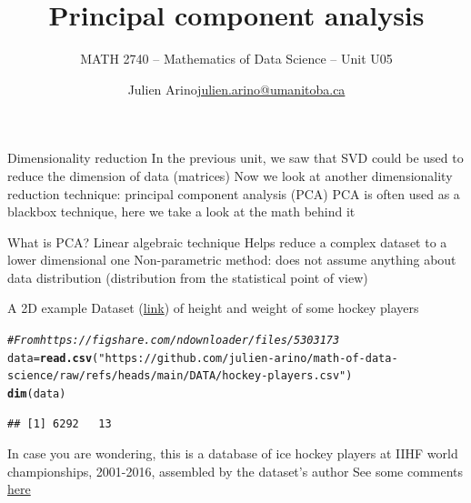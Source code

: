 \documentclass[aspectratio=169]{beamer}\usepackage[]{graphicx}\usepackage[]{xcolor}
\subtitle{MATH 2740 -- Mathematics of Data Science -- Unit U05}
\author{\texorpdfstring{Julien Arino\newline\url{julien.arino@umanitoba.ca}}{Julien Arino}}
\institute{Department of Mathematics @ University of Manitoba}
\title{Principal component analysis}
\makeatletter
\newcommand{\hlsng}[1]{\textcolor[rgb]{0.192,0.494,0.8}{#1}}%
\newcommand{\hlcom}[1]{\textcolor[rgb]{0.678,0.584,0.686}{\textit{#1}}}%
\newcommand{\hldef}[1]{\textcolor[rgb]{0.345,0.345,0.345}{#1}}%
\newcommand{\hlkwb}[1]{\textcolor[rgb]{0.69,0.353,0.396}{#1}}%
\newcommand{\hlkwd}[1]{\textcolor[rgb]{0.737,0.353,0.396}{\textbf{#1}}}%
\newenvironment{kframe}{%
 \def\at@end@of@kframe{}%
 \ifinner\ifhmode%
  \def\at@end@of@kframe{\end{minipage}}%
  \begin{minipage}{\columnwidth}%
 \fi\fi%
 \def\FrameCommand##1{\hskip\@totalleftmargin \hskip-\fboxsep
 \colorbox{shadecolor}{##1}\hskip-\fboxsep
     \hskip-\linewidth \hskip-\@totalleftmargin \hskip\columnwidth}%
 \MakeFramed {\advance\hsize-\width
   \@totalleftmargin\z@ \linewidth\hsize
   \@setminipage}}%
 {\par\unskip\endMakeFramed%
 \at@end@of@kframe}
\newenvironment{knitrout}{}{} %
\makeatother
\begin{document}
\setcounter{theorem}{79}

\SStitlepage
\SSoutlinepage



\begin{frame}{Dimensionality reduction}
In the previous unit, we saw that SVD could be used to reduce the dimension of data (matrices)
\vfill
Now we look at another dimensionality reduction technique: principal component analysis (PCA)
\vfill
PCA is often used as a blackbox technique, here we take a look at the math behind it
\end{frame}


\begin{frame}{What is PCA?}
Linear algebraic technique 
\vfill
Helps reduce a complex dataset to a lower dimensional one
\vfill
Non-parametric method: does not assume anything about data distribution (distribution from the statistical point of view)
\end{frame}


\begin{frame}[fragile]{A 2D example}
Dataset (\href{https://opendata.stackexchange.com/questions/7793/age-weight-and-height-dataset}{link}) of height and weight of some hockey players
\vfill
\begin{knitrout}
\color{fgcolor}\begin{kframe}
\begin{alltt}
\hlcom{# From https://figshare.com/ndownloader/files/5303173}
\hldef{data} \hlkwb{=} \hlkwd{read.csv}\hldef{(}\hlsng{"https://github.com/julien-arino/math-of-data-science/raw/refs/heads/main/DATA/hockey-players.csv"}\hldef{)}
\hlkwd{dim}\hldef{(data)}
\end{alltt}
\begin{verbatim}
## [1] 6292   13
\end{verbatim}
\end{kframe}
\end{knitrout}
\vfill
In case you are wondering, this is a database of ice hockey players at IIHF world championships, 2001-2016, assembled by the dataset's author
\vfill
See some comments \href{https://ikashnitsky.github.io/2017/ice-hockey-players-height/}{here}
\vfill

\end{frame}
\end{document}
